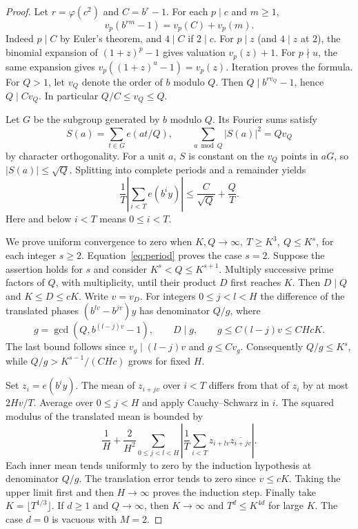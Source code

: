 \documentclass[11pt]{article}
\begin{document}
\begin{proof}
Let \(r=\varphi(c^2)\) and \(C=b^r-1\). For each \(p\mid c\) and \(m\ge1\),
\[
 v_p(b^{rm}-1)=v_p(C)+v_p(m).
\]
Indeed \(p\mid C\) by Euler's theorem, and \(4\mid C\) if \(2\mid c\). For \(p\mid z\) (and \(4\mid z\) at \(2\)), the binomial expansion of \((1+z)^p-1\) gives valuation \(v_p(z)+1\). For \(p\nmid u\), the same expansion gives \(v_p((1+z)^u-1)=v_p(z)\). Iteration proves the formula. For \(Q>1\), let \(v_Q\) denote the order of \(b\) modulo \(Q\). Then \(Q\mid b^{rv_Q}-1\), hence \(Q\mid C v_Q\). In particular \(Q/C\le v_Q\le Q\).

Let \(G\) be the subgroup generated by \(b\) modulo \(Q\). Its Fourier sums satisfy
\[
 S(a)=\sum_{t\in G}e(at/Q),\qquad \sum_{a\bmod Q}|S(a)|^2=Qv_Q
\]
by character orthogonality. For a unit \(a\), \(S\) is constant on the \(v_Q\) points in \(aG\), so \(|S(a)|\le\sqrt Q\). Splitting into complete periods and a remainder yields
\begin{equation}\label{eq:period}
 \frac1T\left|\sum_{i<T}e(b^iy)\right|\le \frac{C}{\sqrt Q}+\frac{Q}{T}.
\end{equation}
Here and below \(i<T\) means \(0\le i<T\).

We prove uniform convergence to zero when \(K,Q\to\infty,\ T\ge K^3,\ Q\le K^s\), for each integer \(s\ge2\). Equation~\eqref{eq:period} proves the case \(s=2\). Suppose the assertion holds for \(s\) and consider \(K^s<Q\le K^{s+1}\). Multiply successive prime factors of \(Q\), with multiplicity, until their product \(D\) first reaches \(K\). Then \(D\mid Q\) and \(K\le D\le cK\). Write \(v=v_D\). For integers \(0\le j<l<H\) the difference of the translated phases \((b^{lv}-b^{jv})y\) has denominator \(Q/g\), where
\[
 g=\gcd(Q,b^{(l-j)v}-1),\qquad D\mid g,\qquad g\le C(l-j)v\le CHcK.
\]
The last bound follows since \(v_g\mid(l-j)v\) and \(g\le C v_g\). Consequently \(Q/g\le K^s\), while \(Q/g>K^{s-1}/(CHc)\) grows for fixed \(H\).

Set \(z_i=e(b^iy)\). The mean of \(z_{i+jv}\) over \(i<T\) differs from that of \(z_i\) by at most \(2Hv/T\). Average over \(0\le j<H\) and apply Cauchy--Schwarz in \(i\). The squared modulus of the translated mean is bounded by
\[
 \frac1H+\frac2{H^2}\sum_{0\le j<l<H}
       \left|\frac1T\sum_{i<T} z_{i+lv}\overline{z_{i+jv}}\right| .
\]
Each inner mean tends uniformly to zero by the induction hypothesis at denominator \(Q/g\). The translation error tends to zero since \(v\le cK\). Taking the upper limit first and then \(H\to\infty\) proves the induction step. Finally take \(K=\lfloor T^{1/3}\rfloor\). If \(d\ge1\) and \(Q\to\infty\), then \(K\to\infty\) and \(T^d\le K^{4d}\) for large \(K\). The case \(d=0\) is vacuous with \(M=2\).
\end{proof}
\end{document}
